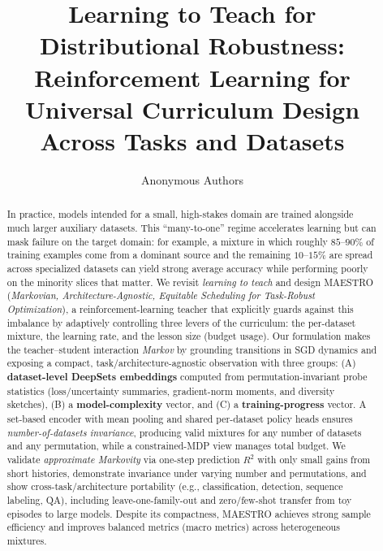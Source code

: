 \documentclass[11pt]{article}
\title{\textbf{Learning to Teach for Distributional Robustness: \\Reinforcement Learning for Universal Curriculum Design Across Tasks and Datasets}}
\author{Anonymous Authors}
\date{}
\newcommand{\1}{\mathbf{1}}
\newcommand{\MAESTRO}{\textsc{MAESTRO}\xspace}
\begin{document}
\maketitle

\begin{abstract}
In practice, models intended for a small, high-stakes domain are trained alongside much larger auxiliary datasets. This “many-to-one” regime accelerates learning but can mask failure on the target domain: for example, a mixture in which roughly $85$–$90\%$ of training examples come from a dominant source and the remaining $10$–$15\%$ are spread across specialized datasets can yield strong average accuracy while performing poorly on the minority slices that matter. We revisit \emph{learning to teach} and design \MAESTRO{ (\emph{Markovian, Architecture-Agnostic, Equitable Scheduling for Task-Robust Optimization})}, a reinforcement-learning teacher that explicitly guards against this imbalance by adaptively controlling three levers of the curriculum: the per-dataset mixture, the learning rate, and the lesson size (budget usage). Our formulation makes the teacher–student interaction \emph{Markov} by grounding transitions in SGD dynamics and exposing a compact, task/architecture-agnostic observation with three groups: (A) \textbf{dataset-level DeepSets embeddings} computed from permutation-invariant probe statistics (loss/uncertainty summaries, gradient-norm moments, and diversity sketches), (B) a \textbf{model-complexity} vector, and (C) a \textbf{training-progress} vector. A set-based encoder with mean pooling and shared per-dataset policy heads ensures \emph{number-of-datasets invariance}, producing valid mixtures for any number of datasets and any permutation, while a constrained-MDP view manages total budget. We validate \emph{approximate Markovity} via one-step prediction $R^2$ with only small gains from short histories, demonstrate invariance under varying number and permutations, and show cross-task/architecture portability (e.g., classification, detection, sequence labeling, QA), including leave-one-family-out and zero/few-shot transfer from toy episodes to large models. Despite its compactness, \MAESTRO{} achieves strong sample efficiency and improves balanced metrics (macro metrics) across heterogeneous mixtures.


\end{abstract}
\end{document}
